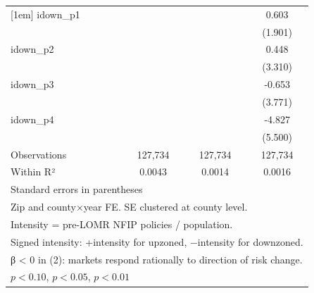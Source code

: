\begin{table}[htbp]
\begin{tabular}{l*{3}{c}}
[1em]
idown\_p1            &                     &                     &       0.603         \\
                    &                     &                     &     (1.901)         \\
[1em]
idown\_p2            &                     &                     &       0.448         \\
                    &                     &                     &     (3.310)         \\
[1em]
idown\_p3            &                     &                     &      -0.653         \\
                    &                     &                     &     (3.771)         \\
[1em]
idown\_p4            &                     &                     &      -4.827         \\
                    &                     &                     &     (5.500)         \\
\hline
Observations        &     127,734         &     127,734         &     127,734         \\
Within R²           &      0.0043         &      0.0014         &      0.0016         \\
\hline\hline
\multicolumn{4}{l}{\footnotesize Standard errors in parentheses}\\
\multicolumn{4}{l}{\footnotesize Zip and county×year FE. SE clustered at county level.}\\
\multicolumn{4}{l}{\footnotesize Intensity = pre-LOMR NFIP policies / population.}\\
\multicolumn{4}{l}{\footnotesize Signed intensity: +intensity for upzoned, −intensity for downzoned.}\\
\multicolumn{4}{l}{\footnotesize β < 0 in (2): markets respond rationally to direction of risk change.}\\
\multicolumn{4}{l}{\footnotesize \sym{*} \(p<0.10\), \sym{**} \(p<0.05\), \sym{***} \(p<0.01\)}\\
\end{tabular}
\end{table}
